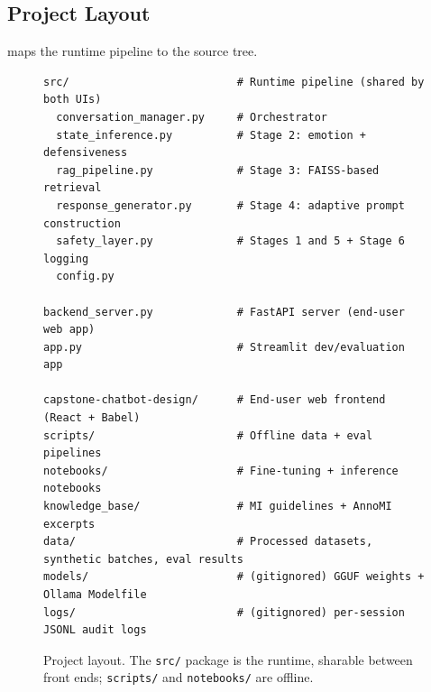 \subsection{Project Layout}

 maps the runtime pipeline to the source tree.

\begin{figure}[h]
\centering
\begin{minipage}{0.92\linewidth}
\begin{lstlisting}[basicstyle=\ttfamily\scriptsize, frame=single, backgroundcolor=\color{lstbg}]
src/                          # Runtime pipeline (shared by both UIs)
  conversation_manager.py     # Orchestrator
  state_inference.py          # Stage 2: emotion + defensiveness
  rag_pipeline.py             # Stage 3: FAISS-based retrieval
  response_generator.py       # Stage 4: adaptive prompt construction
  safety_layer.py             # Stages 1 and 5 + Stage 6 logging
  config.py

backend_server.py             # FastAPI server (end-user web app)
app.py                        # Streamlit dev/evaluation app

capstone-chatbot-design/      # End-user web frontend (React + Babel)
scripts/                      # Offline data + eval pipelines
notebooks/                    # Fine-tuning + inference notebooks
knowledge_base/               # MI guidelines + AnnoMI excerpts
data/                         # Processed datasets, synthetic batches, eval results
models/                       # (gitignored) GGUF weights + Ollama Modelfile
logs/                         # (gitignored) per-session JSONL audit logs
\end{lstlisting}
\end{minipage}
\caption{Project layout. The \texttt{src/} package is the runtime, sharable
between front ends; \texttt{scripts/} and \texttt{notebooks/} are offline.}
\label{fig:layout}
\end{figure}
